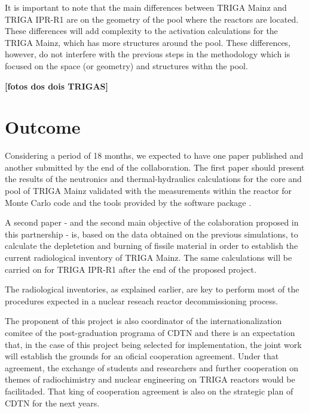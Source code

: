 \documentclass[11pt]{article} %
\begin{document}
It is important to note that the main differences between TRIGA Mainz and TRIGA IPR-R1 are on the geometry of the pool where the reactors are located. These differences will add complexity to the activation calculations for the TRIGA Mainz, which has more structures around the pool. These differences, however, do not interfere with the previous steps in the methodology which is focused on the space (or geometry) and structures withn the pool.


\textbf{[fotos dos dois TRIGAS]}

\section{Outcome}

Considering a period of 18 months, we expected to have one paper published and another submitted by the end of the collaboration. The first paper should present the results of the neutronics and thermal-hydraulics calculations for the core and pool of TRIGA Mainz validated with the measurements within the reactor for \cite[OpenMC]{OpenMC_2015} Monte Carlo code and the tools provided by the software package \cite[SCALE]{SCALE_632}.


A second paper - and the second main objective of the colaboration proposed in this partnership - is, based on the data obtained on the previous simulations, to calculate the depletetion and burning of fissile material in order to establish the current radiological inventory of TRIGA Mainz. The same calculations will be carried on for TRIGA IPR-R1 after the end of the proposed project.

The radiological inventories, as explained earlier, are key to perform most of the procedures expected in a nuclear reseach reactor decommissioning process.

The proponent of this project is also coordinator of the internationalization comitee of the post-graduation programa of CDTN and there is an expectation that, in the case of this project being selected for implementation, the joint work will establish the grounds for an oficial cooperation agreement. Under that agreement, the exchange of students and researchers and further cooperation on themes of radiochimistry and nuclear engineering on TRIGA reactors would be facilitaded. That king of cooperation agreement is also on the strategic plan of CDTN for the next years.
\end{document}
